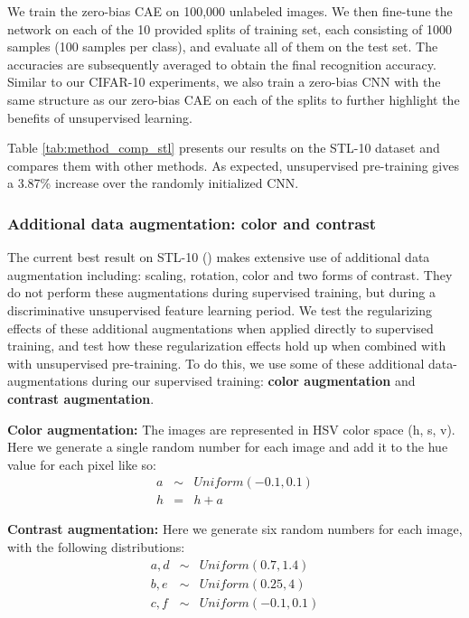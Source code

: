 \documentclass{article} \usepackage{iclr2015,times}
\begin{document}
We train the zero-bias CAE on 100,000 unlabeled images. We then fine-tune the network on each of the 10 provided splits of training set, each consisting of 1000 samples (100 samples per class), and evaluate all of them on the test set. The accuracies are subsequently averaged to obtain the final recognition accuracy. Similar to our CIFAR-10 experiments, we also train a zero-bias CNN with the same structure as our zero-bias CAE on each of the splits to further highlight the benefits of unsupervised learning.

Table \ref{tab:method_comp_stl} presents our results on the STL-10 dataset and compares them with other methods. As expected, unsupervised pre-training gives a 3.87\% increase over the randomly initialized CNN.


\subsubsection{Additional data augmentation: color and contrast}
The current best result on STL-10 (\citet{dosovitskiy2014discriminative}) makes extensive use of additional data augmentation including: scaling, rotation, color and two forms of contrast. They do not perform these augmentations during supervised training, but during a discriminative unsupervised feature learning period. We test the regularizing effects of these additional augmentations when applied directly to supervised training, and test how these regularization effects hold up when combined with with unsupervised pre-training. To do this, we use some of these additional data-augmentations during our supervised training: \textbf{color augmentation} and \textbf{contrast augmentation}.


\textbf{Color augmentation:}
The images are represented in HSV color space (h, s, v). Here we generate a single random number for each image and add it to the hue value for each pixel like so:
\begin{eqnarray}
a &\sim& Uniform(-0.1, 0.1) \\
h &=& h + a
\end{eqnarray}

\textbf{Contrast augmentation:} 
Here we generate six random numbers for each image, with the following distributions:
\begin{eqnarray}
a, d &\sim& Uniform(0.7, 1.4) \\
b, e &\sim& Uniform(0.25, 4) \\
c, f &\sim& Uniform(-0.1, 0.1)
\end{eqnarray}
\end{document}
